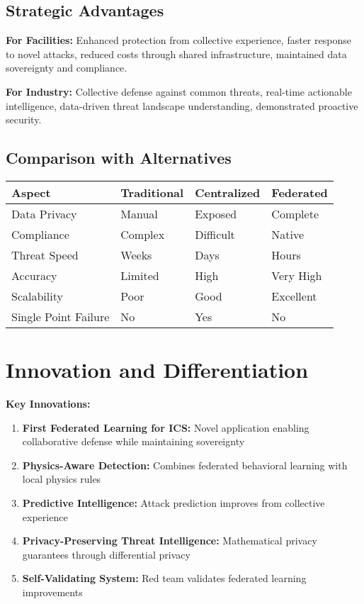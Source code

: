 \documentclass[12pt,a4paper]{article}
\begin{document}
\subsection{Strategic Advantages}

\textbf{For Facilities:}
Enhanced protection from collective experience, faster response to novel attacks, reduced costs through shared infrastructure, maintained data sovereignty and compliance.

\textbf{For Industry:}
Collective defense against common threats, real-time actionable intelligence, data-driven threat landscape understanding, demonstrated proactive security.



\subsection{Comparison with Alternatives}

\begin{center}
\begin{tabular}{|p{3cm}|p{2.5cm}|p{2.5cm}|p{2.5cm}|}
\hline
\textbf{Aspect} & \textbf{Traditional} & \textbf{Centralized} & \textbf{Federated}\\
\hline
Data Privacy & Manual & Exposed & Complete\\
\hline
Compliance & Complex & Difficult & Native\\
\hline
Threat Speed & Weeks & Days & Hours\\
\hline
Accuracy & Limited & High & Very High\\
\hline
Scalability & Poor & Good & Excellent\\
\hline
Single Point Failure & No & Yes & No\\
\hline
\end{tabular}
\end{center}

\section{Innovation and Differentiation}

\textbf{Key Innovations:}
\begin{enumerate}[leftmargin=1cm,itemsep=0pt]
    \item \textbf{First Federated Learning for ICS:} Novel application enabling collaborative defense while maintaining sovereignty
    \item \textbf{Physics-Aware  Detection:} Combines federated behavioral learning with local physics rules
    \item \textbf{Predictive  Intelligence:} Attack prediction improves from collective experience
    \item \textbf{Privacy-Preserving Threat Intelligence:} Mathematical privacy guarantees through differential privacy
    \item \textbf{Self-Validating  System:} Red team validates federated learning improvements
\end{enumerate}
\end{document}
